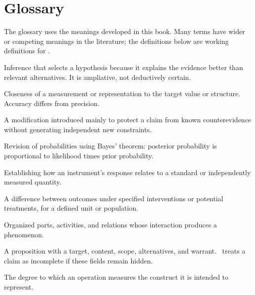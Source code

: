 \chapter{Glossary}
\label{ch:glossary}

The glossary uses the meanings developed in this book. Many terms have wider
or competing meanings in the literature; the definitions below are working
definitions for \RCR.

\begin{description}[style=nextline,leftmargin=0pt,labelindent=0pt,labelwidth=0pt]
\item[Abduction.] Inference that selects a hypothesis because it explains the
evidence better than relevant alternatives. It is ampliative, not deductively
certain.

\item[Accuracy.] Closeness of a measurement or representation to the target
value or structure. Accuracy differs from precision.

\item[Ad hoc adjustment.] A modification introduced mainly to protect a claim
from known counterevidence without generating independent new constraints.

\item[Bayesian updating.] Revision of probabilities using Bayes' theorem:
posterior probability is proportional to likelihood times prior probability.

\item[Calibration.] Establishing how an instrument's response relates to a
standard or independently measured quantity.

\item[Causal effect.] A difference between outcomes under specified
interventions or potential treatments, for a defined unit or population.

\item[Causal mechanism.] Organized parts, activities, and relations whose
interaction produces a phenomenon.

\item[Claim.] A proposition with a target, content, scope, alternatives, and
warrant. \RCR\ treats a claim as incomplete if these fields remain hidden.

\item[Construct validity.] The degree to which an operation measures the
construct it is intended to represent.


\end{description}
